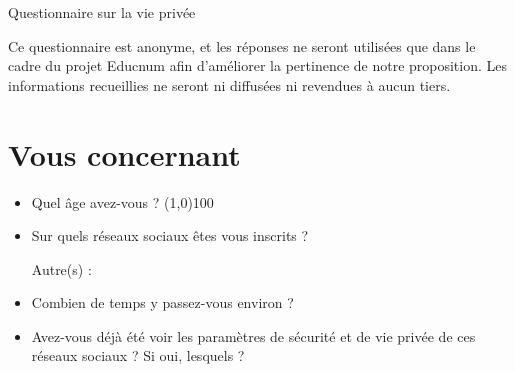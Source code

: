 \documentclass[a4paper]{article}
\begin{document}
\begin{center}
  {\Huge Questionnaire sur la vie privée}\\[4ex]
\end{center}

Ce questionnaire est anonyme, et les réponses ne seront utilisées que dans le cadre du projet Educnum afin d'améliorer la pertinence de notre proposition. Les informations recueillies ne seront ni diffusées ni revendues à aucun tiers.

\section{Vous concernant}

\begin{itemize}

\item Quel âge avez-vous ?
  \hspace{1em}
  \line(1,0){100}

\item Sur quels réseaux sociaux êtes vous inscrits ?


  \begin{multicols}{4}
  \end{multicols}
  \vspace{-1ex}

  Autre(s) :
  \hrulefill\hspace{1em}
  \vspace{.5cm}

\item Combien de temps y passez-vous environ ?
  \begin{multicols}{2}
  \end{multicols}

\item Avez-vous déjà été voir les paramètres de sécurité et de vie privée de ces réseaux sociaux ? Si oui, lesquels ?

  \vspace{.5cm}
  \hrulefill\hspace{1em}

\end{itemize}
\end{document}
